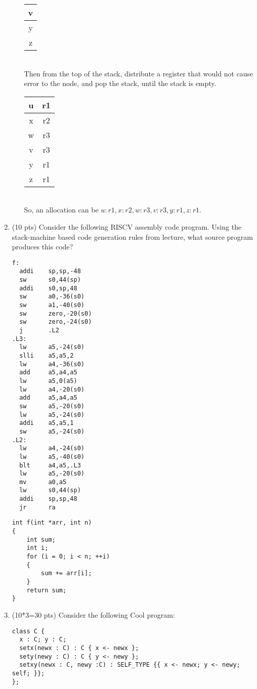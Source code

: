 \documentclass[10pt]{article}
\begin{document}
\begin{enumerate}
\begin{enumerate}
{\begin{tabular}{|c|}
                    \hline
                    v \\
                    \hline
                    y \\
                    \hline
                    z \\
                    \hline
                    \hline
                  \end{tabular}\\
                  Then from the top of the stack, distribute a register that would not cause error to the node, and pop the stack, until the stack is empty.\\
                  \begin{tabular}{|c|c}
                    \\
                    \hline
                    u & r1 \\
                    \hline
                    x & r2 \\
                    \hline
                    w & r3 \\
                    \hline
                    v & r3 \\
                    \hline
                    y & r1 \\
                    \hline
                    z & r1 \\
                    \hline
                    \hline
                  \end{tabular}
                  \\
                  So, an allocation can be $u:r1,x:r2,w:r3,v:r3,y:r1,z:r1$.
                }
        \end{enumerate}
  \item (10 pts) Consider the following RISCV assembly code program.  Using the
        stack-machine based code generation rules from lecture, what source program produces this
        code?
        \begin{verbatim}
f:
  addi    sp,sp,-48
  sw      s0,44(sp)
  addi    s0,sp,48
  sw      a0,-36(s0)
  sw      a1,-40(s0)
  sw      zero,-20(s0)
  sw      zero,-24(s0)
  j       .L2
.L3:
  lw      a5,-24(s0)
  slli    a5,a5,2
  lw      a4,-36(s0)
  add     a5,a4,a5
  lw      a5,0(a5)
  lw      a4,-20(s0)
  add     a5,a4,a5
  sw      a5,-20(s0)
  lw      a5,-24(s0)
  addi    a5,a5,1
  sw      a5,-24(s0)
.L2:
  lw      a4,-24(s0)
  lw      a5,-40(s0)
  blt     a4,a5,.L3
  lw      a5,-20(s0)
  mv      a0,a5
  lw      s0,44(sp)
  addi    sp,sp,48
  jr      ra
\end{verbatim}
        \begin{verbatim}
int f(int *arr, int n)
{
    int sum;
    int i;
    for (i = 0; i < n; ++i)
    {
        sum += arr[i];
    }
    return sum;
}
  \end{verbatim}
  \item (10*3=30 pts) Consider the following Cool program:
        \begin{verbatim}
class C {
  x : C; y : C;
  setx(newx : C) : C { x <- newx };
  sety(newy : C) : C { y <- newy };
  setxy(newx : C, newy :C) : SELF_TYPE {{ x <- newx; y <- newy; self; }};
};


\end{verbatim}
\end{enumerate}
\end{document}
